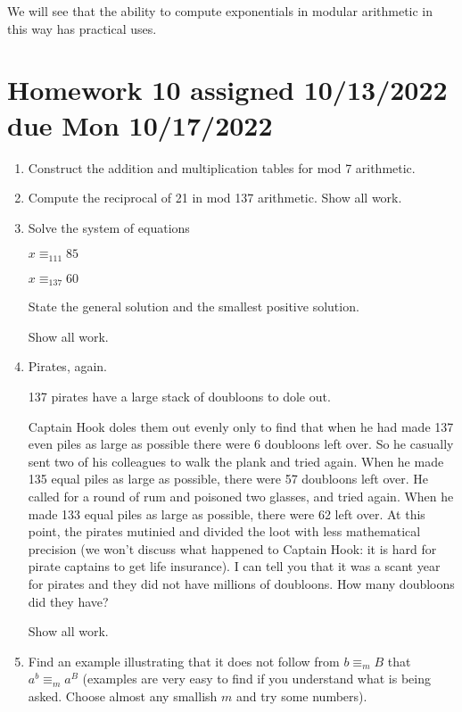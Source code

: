 \documentclass[12pt]{article}
\begin{document}
We will see that the ability to compute exponentials in modular arithmetic in this way has practical uses.

\section{Homework 10 assigned 10/13/2022 due Mon 10/17/2022}

\begin{enumerate}

\item  Construct the addition and multiplication tables for mod 7 arithmetic.

\item Compute the reciprocal of 21 in mod 137 arithmetic.  Show all work.

\item  Solve the system of equations

$x \equiv_{111} 85$

$x \equiv_{137} 60$

State the general solution and the smallest positive solution.

Show all work.

\item  Pirates, again.

137 pirates have a large stack of doubloons to dole out.

Captain Hook doles them out evenly only to find that when he had made 137 even piles as large as possible there were 6 doubloons left over.
So he casually sent two of his colleagues to walk the plank and tried again.  When he made 135 equal piles as large as possible, there were 57 doubloons left over.   He called for a round of rum and poisoned two glasses, and tried again.  When he made 133 equal piles as large as possible, there were 62 left over.  At this point, the pirates mutinied and divided the loot with less mathematical precision (we won't discuss what happened to Captain Hook: it is hard for pirate captains to get life insurance).  I can tell you that it was a scant year for pirates and they did not have millions of doubloons.  How many doubloons did they have?

Show all work.

\item  Find an example illustrating that it does not follow from $b \equiv_m B$ that $a^b \equiv_m a^B$ (examples are very easy to find if you understand what is being asked.  Choose almost any smallish $m$ and try some numbers).


\end{enumerate}
\end{document}

